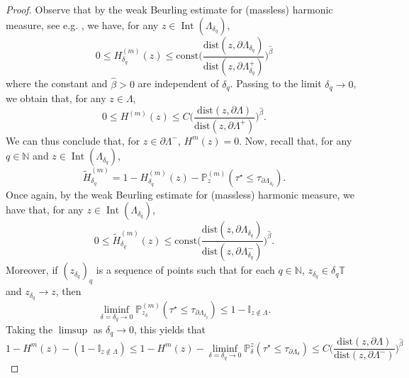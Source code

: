 \documentclass{article}
\newcommand{\PP}{{\mathbb{P}}}
\theoremstyle{definition}
\theoremstyle{remark}
\theoremstyle{remark}
\begin{document}
\begin{proof}
Observe that by the weak Beurling estimate for (massless) harmonic measure, see e.g. \cite[Proposition~2.11]{Discrete_analysis}, we have, for any $z \in \operatorname{Int}(\Lambda_{\delta_q})$,
\begin{equation*}
    0 \leq H^{(m)}_{\delta_q}(z) \leq \text{const} \bigg( \frac{\text{dist}(z, \partial \Lambda_{\delta_{q}})}{\text{dist}(z, \partial \Lambda_{\delta_{q}}^{+})}\bigg)^{\hat \beta}
\end{equation*}
where the constant and $\hat \beta > 0$ are independent of $\delta_q$. Passing to the limit $\delta_{q} \to 0$, we obtain that, for any $z \in \Lambda$,
\begin{equation*}
    0 \leq H^{(m)}(z) \leq C \bigg( \frac{\text{dist}(z, \partial \Lambda)}{\text{dist}(z, \partial \Lambda^{+})}\bigg)^{\hat \beta}.
\end{equation*}
We can thus conclude that, for $z \in \partial \Lambda^{-}$, $H^m(z)= 0$. Now, recall that, for any $q \in \mathbb{N}$ and $z \in \operatorname{Int}(\Lambda_{\delta_{q}})$,
\begin{equation*}
    \tilde H_{\delta_{q}}^{(m)} = 1 -  H_{\delta_{q}}^{(m)}(z) - \PP_z^{(m)}(\tau^{\star} \leq \tau_{\partial \Lambda_{\delta_{q}}}).
\end{equation*}
Once again, by the weak Beurling estimate for (massless) harmonic measure, we have that, for any $z \in \operatorname{Int}(\Lambda_{\delta_{q}})$,
\begin{equation} \label{Beurling_w}
    0 \leq \tilde H_{\delta_{q}}^{(m)}(z) \leq \text{const} \bigg( \frac{\text{dist}(z, \partial \Lambda_{\delta_{q}})}{\text{dist}(z, \partial \Lambda_{\delta_{q}}^{-})}\bigg)^{\hat \beta}.
\end{equation}
Moreover, if $(z_{\delta_q})_q$ is a sequence of points such that for each $q \in \mathbb{N}$, $z_{\delta_q} \in \delta_q\mathbb{T}$ and $z_{\delta_q} \to z$, then
\begin{equation*}
    \liminf_{\delta = \delta_{q} \to 0}  \PP_{z_\delta}^{(m)}(\tau^{\star} \leq \tau_{\partial \Lambda_{\delta_{q}}}) \leq 1-\mathbb{I}_{z \notin \Lambda}.
\end{equation*}
Taking the $\limsup$ as $\delta_{q} \to 0$, this yields that
\begin{equation*}
    1- H^m(z) - (1-\mathbb{I}_{z \notin \Lambda}) \leq 1-H^m(z)-\liminf_{\delta = \delta_{q} \to 0} \PP_{\delta}^{z}(\tau^{\star} \leq \tau_{\partial \Lambda_{\delta}}) \leq C \bigg( \frac{\text{dist}(z, \partial \Lambda)}{\text{dist}(z, \partial \Lambda^{-})}\bigg)^{\hat \beta}

\end{equation*}
\end{proof}
\end{document}
